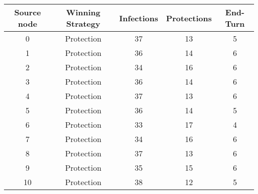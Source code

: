 \documentclass[results.tex]{subfiles}
\begin{document}
    \begin{center}
        \begin{tabular}{| c || c | c | c | c |}
            \hline
            {\bfseries Source node} & {\bfseries Winning Strategy} & {\bfseries Infections} & {\bfseries Protections}
            & {\bfseries End-Turn}
            \\  %
            \hline\hline
            0                       & Protection                   & 37                     & 13                      & 5                    \\
            \hline
            1                       & Protection                   & 36                     & 14                      & 6                    \\
            \hline
            2                       & Protection                   & 34                     & 16                      & 6                    \\
            \hline
            3                       & Protection                   & 36                     & 14                      & 6                    \\
            \hline
            4                       & Protection                   & 37                     & 13                      & 6                    \\
            \hline
            5                       & Protection                   & 36                     & 14                      & 5                    \\
            \hline
            6                       & Protection                   & 33                     & 17                      & 4                    \\
            \hline
            7                       & Protection                   & 34                     & 16                      & 6                    \\
            \hline
            8                       & Protection                   & 37                     & 13                      & 6                    \\
            \hline
            9                       & Protection                   & 35                     & 15                      & 6                    \\
            \hline
            10                      & Protection                   & 38                     & 12                      & 5                    \\

\end{tabular}
\end{center}
\end{document}

